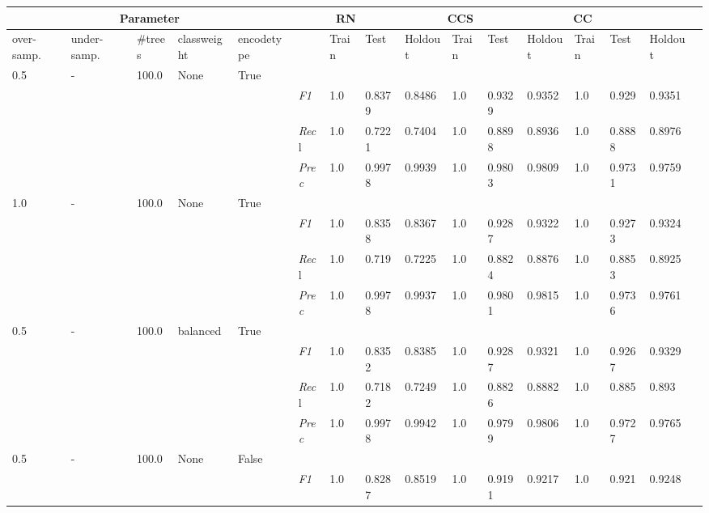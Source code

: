 \begin{table}[]
\tiny
\tabcolsep=0.11cm
\begin{tabularx}{\textwidth}{XXXXX|X|XXX|XXX|XXXX}
\toprule
\multicolumn{5}{c}{Parameter} & \multicolumn{3}{c}{RN} & \multicolumn{3}{c}{CCS} & \multicolumn{3}{c}{CC} \\ \midrule
over-\newline samp. & under-\newline samp. & \#trees & class\newline weight & encode\newline type  & & Train &  Test & Holdout & Train &  Test & Holdout & Train &  Test & Holdout \\ \midrule
0.5 & - & 100.0 & None & True& & & & & & & & & \\
& & & & & \textit{F1} & 1.0 & 0.8379 & 0.8486 & 1.0 & 0.9329        & 0.9352        & 1.0        & 0.929        & 0.9351        \\
& & & & & \textit{Rec}l & 1.0 & 0.7221 & 0.7404    & 1.0 & 0.8898    & 0.8936    & 1.0    & 0.8888    & 0.8976    \\
& & & & & \textit{Prec} & 1.0 & 0.9978 & 0.9939 & 1.0 & 0.9803 & 0.9809 & 1.0 & 0.9731 & 0.9759 \\ \midrule
1.0 & - & 100.0 & None & True& & & & & & & & & \\
& & & & & \textit{F1} & 1.0 & 0.8358 & 0.8367 & 1.0 & 0.9287        & 0.9322        & 1.0        & 0.9273        & 0.9324        \\
& & & & & \textit{Rec}l & 1.0 & 0.719 & 0.7225    & 1.0 & 0.8824    & 0.8876    & 1.0    & 0.8853    & 0.8925    \\
& & & & & \textit{Prec} & 1.0 & 0.9978 & 0.9937 & 1.0 & 0.9801 & 0.9815 & 1.0 & 0.9736 & 0.9761 \\ \midrule
0.5 & - & 100.0 & balanced & True& & & & & & & & & \\
& & & & & \textit{F1} & 1.0 & 0.8352 & 0.8385 & 1.0 & 0.9287        & 0.9321        & 1.0        & 0.9267        & 0.9329        \\
& & & & & \textit{Rec}l & 1.0 & 0.7182 & 0.7249    & 1.0 & 0.8826    & 0.8882    & 1.0    & 0.885    & 0.893    \\
& & & & & \textit{Prec} & 1.0 & 0.9978 & 0.9942 & 1.0 & 0.9799 & 0.9806 & 1.0 & 0.9727 & 0.9765 \\ \midrule
0.5 & - & 100.0 & None & False& & & & & & & & & \\
& & & & & \textit{F1} & 1.0 & 0.8287 & 0.8519 & 1.0 & 0.9191        & 0.9217        & 1.0        & 0.921        & 0.9248        \\

\end{tabularx}
\end{table}
